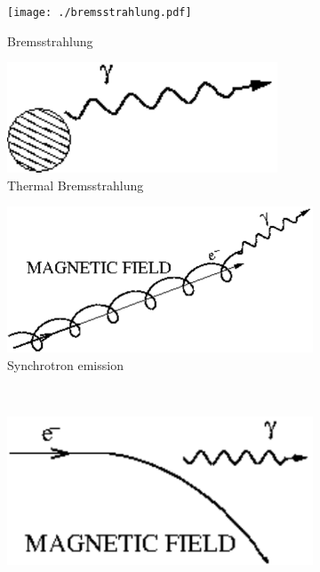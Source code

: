 \documentclass[main.tex]{subfiles}
\begin{document}
\begin{figure}[h]
\begin{subfigure}{0.31\textwidth}
\texttt{[image: ./bremsstrahlung.pdf]}
\caption{Bremsstrahlung} \label{fig:1a}
\end{subfigure}
\hspace*{\fill} %
\begin{subfigure}{0.31\textwidth}
\includegraphics[width=\linewidth]{Pictures/thermalbrehms.pdf}
\caption{Thermal Bremsstrahlung} \label{fig:1b}
\end{subfigure}
\hspace*{\fill} %
\begin{subfigure}{0.31\textwidth}
\includegraphics[width=\linewidth]{Pictures/synchrotron.pdf}
\caption{Synchrotron emission} \label{fig:1c} 
\end{subfigure} \\
\begin{subfigure}{0.31\textwidth}
\includegraphics[width=\linewidth]{Pictures/curvaturerad.pdf}

\end{subfigure}
\end{figure}
\end{document}
